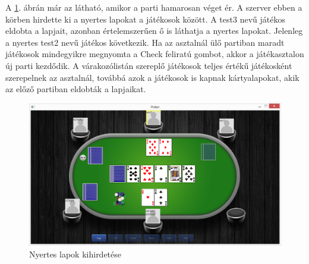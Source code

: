 A \ref{fig:parti_4}. ábrán már az látható, amikor a parti hamarosan véget ér. A szerver ebben a körben hirdette ki a nyertes lapokat a játékosok között. A test3 nevű játékos eldobta a lapjait, azonban értelemszerűen ő is láthatja a nyertes lapokat. Jelenleg a nyertes test2 nevű játékos következik. Ha az asztalnál ülő partiban maradt játékosok mindegyikre megnyomta a Check feliratú gombot, akkor a játékasztalon új parti kezdődik. A várakozólistán szereplő játékosok teljes értékű játékosként szerepelnek az asztalnál, továbbá azok a játékosok is kapnak kártyalapokat, akik az előző partiban eldobták a lapjaikat.
 \begin{figure}[h!]
  \caption{Nyertes lapok kihirdetése}
  \label{fig:parti_4}
  \centering
    \includegraphics[width=\textwidth]{user-documentation/images/parti/parti_4.jpg}
\end{figure}

\clearpage
